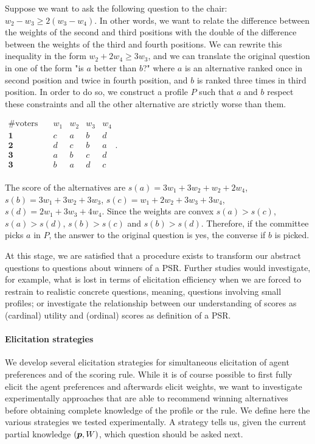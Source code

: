 \documentclass{article}
\begin{document}
\begin{example*}
	Suppose we want to ask the following question to the chair: $w_{2} - w_{3} ≥ 2 (w_{3} - w_{4})$. In other words, we want to relate the difference between the weights of the second and third positions with the double of the difference between the weights of the third and fourth positions. We can rewrite this inequality in the form $w_{2} + 2 w_{4} ≥ 3 w_{3}$, and we can translate the original question in one of the form "is $a$ better than $b$?" where $a$ is an alternative ranked once in second position and twice in fourth position, and $b$ is ranked three times in third position. In order to do so, we construct a profile $P$ such that $a$ and $b$ respect these constraints and all the other alternative are strictly worse than them. 
	\begin{center}
		$
		\begin{array}{ccccc}
			\#\text{voters} \quad &w_1&w_2&w_3&w_4\\
			\mathbf{1} \quad &c&a&b&d\\
			\mathbf{2} \quad &d&c&b&a\\
			\mathbf{3} \quad &a&b&c&d\\
			\mathbf{3} \quad &b&a&d&c\\
		\end{array}.
		$
	\end{center}
	The score of the alternatives are $s(a)=3w_1+3w_2+w_2+2w_4$, $s(b)=3w_1+3w_2+3w_3$, $s(c)=w_1+2w_2+3w_3+3w_4$, $s(d)=2w_1+3w_3+4w_4$. Since the weights are convex $s(a)>s(c)$, $s(a)>s(d)$, $s(b)>s(c)$ and $s(b)>s(d)$. Therefore, if the committee picks $a$ in $P$, the answer to the original question is yes, the converse if $b$ is picked.
\end{example*}

At this stage, we are satisfied that a procedure exists to transform our abstract questions to questions about winners of a PSR. Further studies would investigate, for example, what is lost in terms of elicitation efficiency when we are forced to restrain to realistic concrete questions, meaning, questions involving small profiles; or investigate the relationship between our understanding of scores as (cardinal) utility and (ordinal) scores as definition of a PSR.

\paragraph{Elicitation strategies}
We develop several elicitation strategies for simultaneous elicitation of agent preferences and of the scoring rule.
While it is of course possible to first fully elicit the agent preferences and afterwards elicit weights, we want to investigate experimentally approaches that are able to recommend winning alternatives before obtaining complete knowledge of the profile or the rule.
We define here the various strategies we tested experimentally. A strategy tells us, given the current partial knowledge $({\bm{p}}, W)$, which question should be asked next.
\end{document}
